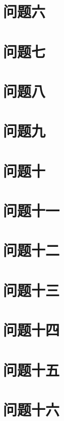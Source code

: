 \documentclass[fontset=windowsnew,zihao=-4,scheme=chinese,punct=quanjiao,linespread=1.35,UTF8]{ctexart}
\begin{document}
\section{问题六}

\section{问题七}

\section{问题八}

\section{问题九}

\section{问题十}

\section{问题十一}

\section{问题十二}

\section{问题十三}

\section{问题十四}

\section{问题十五}

\section{问题十六}

\end{document}

